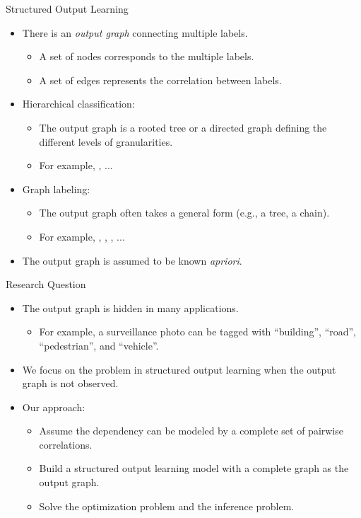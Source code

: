 \documentclass[first=dgreen,second=purple,logo=yellowexc]{aaltoslides}
\begin{document}
\begin{frame}{Structured Output Learning}
	\begin{itemize}
		\item There is an \textit{output graph} connecting multiple labels.
		\begin{itemize}
			\item A set of nodes corresponds to the multiple labels.
			\item A set of edges represents the correlation between labels.
		\end{itemize}
		\item Hierarchical classification:
		\begin{itemize}
			\item The output graph is a rooted tree or a directed graph defining the different levels of granularities.
			\item For example, \svmstruct, ...
		\end{itemize}
		\item Graph labeling:
		\begin{itemize}
			\item The output graph often takes a general form (e.g., a tree, a chain).
			\item For example, \mmmn, \crf, \mmcrf, ...
		\end{itemize}
		\item The output graph is assumed to be known \textit{apriori}.
	\end{itemize}
\end{frame}



%
\begin{frame}{Research Question}
	\begin{itemize}
		\item The output graph is hidden in many applications.
		\begin{itemize}
			\item For example, a surveillance photo can be tagged with ``building'', ``road'', ``pedestrian'', and ``vehicle''.
		\end{itemize}
		\item We focus on the problem in structured output learning when the output graph is not observed.
		\item Our approach:
		\begin{itemize}
			\item Assume the dependency can be modeled by a complete set of pairwise correlations.
			\item Build a structured output learning model with a complete graph as the output graph.
			\item Solve the optimization problem and the inference problem.
		\end{itemize}
	\end{itemize}
\end{frame}
\end{document}
